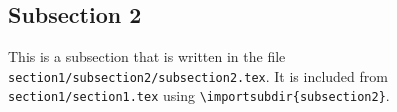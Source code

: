 \subsection{Subsection 2}

This is a subsection that is written in the file
\texttt{section1/subsection2/subsection2.tex}.
It is included from \texttt{section1/section1.tex} using
\texttt{\textbackslash importsubdir\{subsection2\}}.

